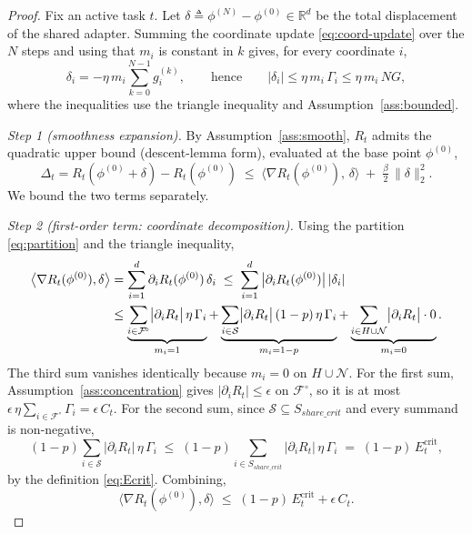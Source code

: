 \begin{proof}
Fix an active task $t$. Let
$\delta\triangleq\phi^{(N)}-\phi^{(0)}\in\mathbb{R}^{d}$ be the total
displacement of the shared adapter. Summing the coordinate update
\eqref{eq:coord-update} over the $N$ steps and using that $m_{i}$ is
constant in $k$ gives, for every coordinate $i$,
\begin{equation}
\label{eq:disp}
\delta_{i}=-\eta\,m_{i}\sum_{k=0}^{N-1}g^{(k)}_{i},
\qquad\text{hence}\qquad
|\delta_{i}|\le \eta\,m_{i}\,\Gamma_{i}\le \eta\,m_{i}\,NG ,
\end{equation}
where the inequalities use the triangle inequality and
Assumption~\ref{ass:bounded}.

\emph{Step 1 (smoothness expansion).}
By Assumption~\ref{ass:smooth}, $R_{t}$ admits the quadratic upper
bound (descent-lemma form), evaluated at the base point
$\phi^{(0)}$,
\begin{equation}
\label{eq:taylor}
\Delta_{t}=R_{t}(\phi^{(0)}+\delta)-R_{t}(\phi^{(0)})
\;\le\;
\big\langle\nabla R_{t}(\phi^{(0)}),\,\delta\big\rangle
\;+\;\tfrac{\beta}{2}\,\|\delta\|_{2}^{2}.
\end{equation}
We bound the two terms separately.

\emph{Step 2 (first-order term: coordinate decomposition).}
Using the partition \eqref{eq:partition} and the triangle inequality,
\begin{align}
\big\langle\nabla R_{t}(\phi^{(0)}),\delta\big\rangle
&=\sum_{i=1}^{d}\partial_{i}R_{t}(\phi^{(0)})\,\delta_{i}
 \;\le\;\sum_{i=1}^{d}\big|\partial_{i}R_{t}(\phi^{(0)})\big|\,|\delta_{i}|
 \notag\\
&\le
\underbrace{\sum_{i\in\mathcal{F}^{\!\circ}}\!\big|\partial_{i}R_{t}\big|\,\eta\,\Gamma_{i}}_{m_i=1}
+\underbrace{\sum_{i\in\mathcal{S}}\!\big|\partial_{i}R_{t}\big|\,(1-p)\,\eta\,\Gamma_{i}}_{m_i=1-p}
+\underbrace{\sum_{i\in H\cup\mathcal{N}}\!\big|\partial_{i}R_{t}\big|\cdot 0}_{m_i=0}.
\label{eq:three-sums}
\end{align}
The third sum vanishes identically because $m_{i}=0$ on $H\cup\mathcal{N}$.
For the first sum, Assumption~\ref{ass:concentration} gives
$|\partial_{i}R_{t}|\le\epsilon$ on $\mathcal{F}^{\!\circ}$, so it is
at most $\epsilon\,\eta\sum_{i\in\mathcal{F}^{\!\circ}}\Gamma_{i}=\epsilon\,C_{t}$.
For the second sum, since $\mathcal{S}\subseteq S_{share\_crit}$ and
every summand is non-negative,
\begin{equation}
(1-p)\!\sum_{i\in\mathcal{S}}\!\big|\partial_{i}R_{t}\big|\,\eta\,\Gamma_{i}
\;\le\;
(1-p)\!\!\sum_{i\in S_{share\_crit}}\!\!\big|\partial_{i}R_{t}\big|\,\eta\,\Gamma_{i}
\;=\;(1-p)\,E^{\mathrm{crit}}_{t},
\end{equation}
by the definition \eqref{eq:Ecrit}. Combining,
\begin{equation}
\label{eq:first-order-bound}
\big\langle\nabla R_{t}(\phi^{(0)}),\delta\big\rangle
\;\le\;(1-p)\,E^{\mathrm{crit}}_{t}+\epsilon\,C_{t}.
\end{equation}


\end{proof}
